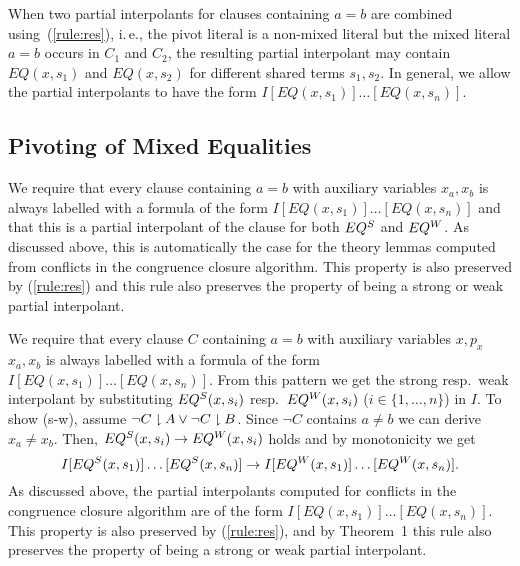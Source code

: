 When two partial interpolants for clauses containing $a=b$ are
combined using~(\ref{rule:res}), i.\,e., the pivot literal is a
non-mixed literal but the mixed literal $a=b$ occurs in $C_1$ and
$C_2$, the resulting partial interpolant may contain $EQ(x,s_1)$ and
$EQ(x,s_2)$ for different shared terms $s_1, s_2$.  In general, we allow
the partial interpolants to have the form $I[EQ(x,s_1)]\dots[EQ(x,s_n)]$.

  
\subsection{Pivoting of Mixed Equalities}

\begin{tacas}
We require that every clause containing $a=b$ with auxiliary variables
$x_a,x_b$ is always labelled with a formula of the form
$I[EQ(x,s_1)]\dots[EQ(x,s_n)]$ and that this is a partial
interpolant of the clause for both $EQ\S$ and $EQ\W$.  As discussed
above, this is automatically the case for the theory lemmas computed
from conflicts in the congruence closure algorithm.  This property is
also preserved by (\ref{rule:res}) and this rule also preserves the
property of being a 
\ifnewinterpolation\else strong or weak \fi
partial interpolant.
\end{tacas}
\begin{techreport}
We require that every clause $C$ containing $a=b$ with auxiliary variables
\ifnewinterpolation $x,p_x$ \else $x_a,x_b$ \fi
is always labelled with a formula of the form
$I[EQ(x,s_1)]\dots[EQ(x,s_n)]$.  
\ifnewinterpolation\else
From this pattern we get the strong
resp.\ weak interpolant by substituting $EQ\S(x,s_i)$ resp.\ $EQ\W(x,s_i)$
($i\in\{1,\dots,n\}$) in $I$.  To show (s-w), assume $\lnot C\proj
A\lor \lnot C\proj B$.
Since $\lnot C$ contains $a \neq b$ we can derive $x_a\neq x_b$.
Then, $EQ\S(x,s_i) \rightarrow EQ\W(x,s_i)$ holds and by
monotonicity we get
\[
I[EQ\S(x,s_1)]\dots[EQ\S(x,s_n)] \rightarrow
I[EQ\W(x,s_1)]\dots[EQ\W(x,s_n)].\]
\fi
%
As discussed above, the partial interpolants computed for
conflicts in the congruence closure algorithm are of the form
$I[EQ(x,s_1)]\dots[EQ(x,s_n)]$. 
This property is also preserved by (\ref{rule:res}), and by Theorem~1 this
rule also preserves the property of being a 
\ifnewinterpolation\else strong or weak \fi
partial interpolant.
\end{techreport}
\ifnewinterpolation\else

